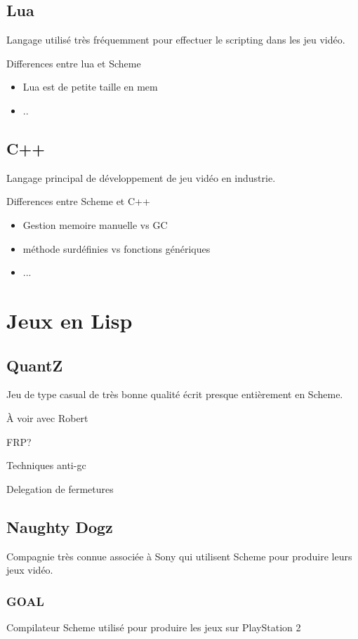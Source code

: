 \documentclass[12pt,oneside,letterpaper,francais]{book}
\begin{document}
\subsection{Lua}
Langage utilisé très fréquemment pour effectuer le \og scripting \fg
dans les jeu vidéo.

Differences entre lua et Scheme
\begin{itemize}
\item Lua est de petite taille en mem
\item ..
\end{itemize}

\subsection{C++}
Langage principal de développement de jeu vidéo en industrie.

Differences entre Scheme et C++
\begin{itemize}
\item Gestion memoire manuelle vs GC
\item méthode surdéfinies vs fonctions génériques
\item ...
\end{itemize}


\section{Jeux en Lisp}

\subsection{QuantZ}
Jeu de type \og casual \fg de très bonne qualité écrit presque
entièrement en Scheme.

À voir avec Robert

FRP?

Techniques anti-gc

Delegation de fermetures

\subsection{Naughty Dogz}
Compagnie très connue associée à Sony qui utilisent Scheme pour
produire leurs jeux vidéo.

\subsubsection{GOAL}
Compilateur Scheme utilisé pour produire les jeux sur PlayStation 2
\end{document}
